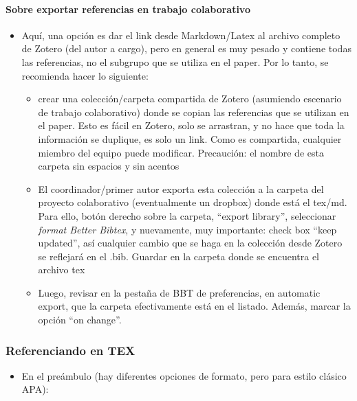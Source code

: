 \documentclass[
  11pt,
]{book}
\providecommand{\tightlist}{%
  \setlength{\itemsep}{0pt}\setlength{\parskip}{0pt}}
\begin{document}
\hypertarget{sobre-exportar-referencias-en-trabajo-colaborativo}{%
\paragraph{Sobre exportar referencias en trabajo colaborativo}\label{sobre-exportar-referencias-en-trabajo-colaborativo}}

\begin{itemize}
\tightlist
\item
  Aquí, una opción es dar el link desde Markdown/Latex al archivo completo de Zotero (del autor a cargo), pero en general es muy pesado y contiene todas las referencias, no el subgrupo que se utiliza en el paper. Por lo tanto, se recomienda hacer lo siguiente:

  \begin{itemize}
  \tightlist
  \item
    crear una colección/carpeta compartida de Zotero (asumiendo escenario de trabajo colaborativo) donde se copian las referencias que se utilizan en el paper. Esto es fácil en Zotero, solo se arrastran, y no hace que toda la información se duplique, es solo un link. Como es compartida, cualquier miembro del equipo puede modificar. Precaución: el nombre de esta carpeta sin espacios y sin acentos
  \item
    El coordinador/primer autor exporta esta colección a la carpeta del proyecto colaborativo (eventualmente un dropbox) donde está el tex/md. Para ello, botón derecho sobre la carpeta, ``export library'', seleccionar \emph{format Better Bibtex}, y nuevamente, muy importante: check box ``keep updated'', así cualquier cambio que se haga en la colección desde Zotero se reflejará en el .bib. Guardar en la carpeta donde se encuentra el archivo tex
  \item
    Luego, revisar en la pestaña de BBT de preferencias, en automatic export, que la carpeta efectivamente está en el listado. Además, marcar la opción ``on change''.
  \end{itemize}
\end{itemize}

\hypertarget{referenciando-en-tex}{%
\subsubsection{Referenciando en TEX}\label{referenciando-en-tex}}

\begin{itemize}
\tightlist
\item
  En el preámbulo (hay diferentes opciones de formato, pero para estilo clásico APA):
\end{itemize}
\end{document}
